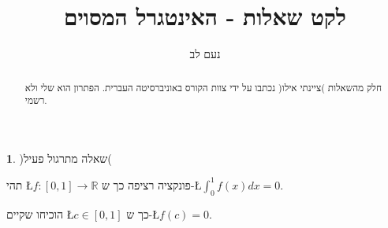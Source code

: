 \documentclass[english,hebrew]{article}
\theoremstyle{plain}
\theoremstyle{definition}
\newtheorem{xca}[thm]{\protect\exercisename}
\theoremstyle{definition}
\providecommand{\exercisename}{תרגיל}
\begin{document}
\title{לקט שאלות - האינטגרל המסוים}
\author{נעם לב}
\maketitle
\begin{abstract}
חלק מהשאלות )ציינתי אילו( נכתבו על ידי צוות הקורס באוניברסיטה העברית.
הפתרון הוא שלי ולא רשמי.
\end{abstract}
\medskip{}

\tableofcontents{}

\newpage{}
\begin{xca}
)שאלה מתרגול פעיל(

תהי \L{$f:[0,1]\to\mathbb{R}$} פונקציה רציפה כך ש-\L{$\int_{0}^{1}f(x)dx=0$}. 

הוכיחו שקיים \L{$c\in[0,1]$} כך ש-\L{$f(c)=0$}. 
\end{xca}
\end{document}
